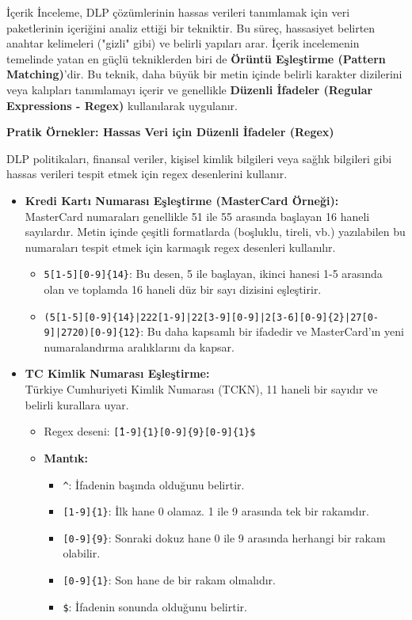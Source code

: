 İçerik İnceleme, DLP çözümlerinin hassas verileri tanımlamak için veri paketlerinin içeriğini analiz ettiği bir tekniktir. Bu süreç, hassasiyet belirten anahtar kelimeleri ("gizli" gibi) ve belirli yapıları arar. İçerik incelemenin temelinde yatan en güçlü tekniklerden biri de \textbf{Örüntü Eşleştirme (Pattern Matching)}'dir. Bu teknik, daha büyük bir metin içinde belirli karakter dizilerini veya kalıpları tanımlamayı içerir ve genellikle \textbf{Düzenli İfadeler (Regular Expressions - Regex)} kullanılarak uygulanır.

\textbf{Pratik Örnekler: Hassas Veri için Düzenli İfadeler (Regex)}

DLP politikaları, finansal veriler, kişisel kimlik bilgileri veya sağlık bilgileri gibi hassas verileri tespit etmek için regex desenlerini kullanır.

\begin{itemize}
    \item \textbf{Kredi Kartı Numarası Eşleştirme (MasterCard Örneği):} \\
    MasterCard numaraları genellikle 51 ile 55 arasında başlayan 16 haneli sayılardır. Metin içinde çeşitli formatlarda (boşluklu, tireli, vb.) yazılabilen bu numaraları tespit etmek için karmaşık regex desenleri kullanılır.
    \begin{itemize}
        \item \texttt{5[1-5][0-9]\{14\}}: Bu desen, 5 ile başlayan, ikinci hanesi 1-5 arasında olan ve toplamda 16 haneli düz bir sayı dizisini eşleştirir.
        \item \texttt{(5[1-5][0-9]\{14\}|222[1-9]|22[3-9][0-9]|2[3-6][0-9]\{2\}|27[0-9]|2720)[0-9]\{12\}}: Bu daha kapsamlı bir ifadedir ve MasterCard'ın yeni numaralandırma aralıklarını da kapsar.
    \end{itemize}

    \item \textbf{TC Kimlik Numarası Eşleştirme:} \\
    Türkiye Cumhuriyeti Kimlik Numarası (TCKN), 11 haneli bir sayıdır ve belirli kurallara uyar.
    \begin{itemize}
        \item Regex deseni: \texttt{\^[1-9]\{1\}[0-9]\{9\}[0-9]\{1\}\$}
        \item \textbf{Mantık:}
        \begin{itemize}
            \item \texttt{\^}: İfadenin başında olduğunu belirtir.
            \item \texttt{[1-9]\{1\}}: İlk hane 0 olamaz. 1 ile 9 arasında tek bir rakamdır.
            \item \texttt{[0-9]\{9\}}: Sonraki dokuz hane 0 ile 9 arasında herhangi bir rakam olabilir.
            \item \texttt{[0-9]\{1\}}: Son hane de bir rakam olmalıdır.
            \item \texttt{\$}: İfadenin sonunda olduğunu belirtir.
        \end{itemize}
    \end{itemize}
\end{itemize}



